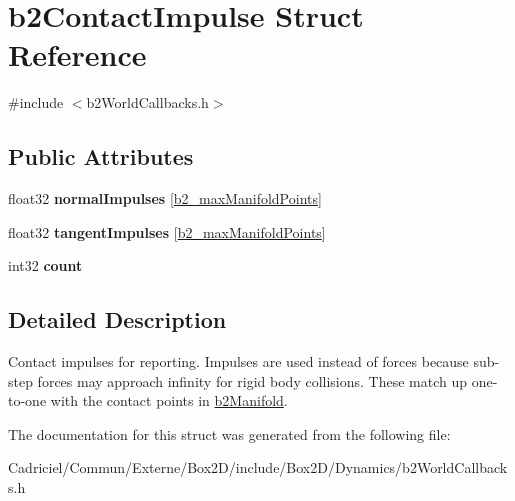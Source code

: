 \hypertarget{structb2_contact_impulse}{}\section{b2\+Contact\+Impulse Struct Reference}
\label{structb2_contact_impulse}


{\ttfamily \#include $<$b2\+World\+Callbacks.\+h$>$}

\subsection*{Public Attributes}
\begin{DoxyCompactItemize}
\item 
float32 {\bfseries normal\+Impulses} \mbox{[}\hyperlink{b2_settings_8h_aa5f44cc9edf711433dea2b2ec94f3c42}{b2\+\_\+max\+Manifold\+Points}\mbox{]}\hypertarget{structb2_contact_impulse_a553d3562a3a34ea013e2d9860f6fd207}{}\label{structb2_contact_impulse_a553d3562a3a34ea013e2d9860f6fd207}

\item 
float32 {\bfseries tangent\+Impulses} \mbox{[}\hyperlink{b2_settings_8h_aa5f44cc9edf711433dea2b2ec94f3c42}{b2\+\_\+max\+Manifold\+Points}\mbox{]}\hypertarget{structb2_contact_impulse_aebd9875b1f55a90865770a53e30e609a}{}\label{structb2_contact_impulse_aebd9875b1f55a90865770a53e30e609a}

\item 
int32 {\bfseries count}\hypertarget{structb2_contact_impulse_a258e094ab0d769971f40d6c144420bf7}{}\label{structb2_contact_impulse_a258e094ab0d769971f40d6c144420bf7}

\end{DoxyCompactItemize}


\subsection{Detailed Description}
Contact impulses for reporting. Impulses are used instead of forces because sub-\/step forces may approach infinity for rigid body collisions. These match up one-\/to-\/one with the contact points in \hyperlink{structb2_manifold}{b2\+Manifold}. 

The documentation for this struct was generated from the following file\+:\begin{DoxyCompactItemize}
\item 
Cadriciel/\+Commun/\+Externe/\+Box2\+D/include/\+Box2\+D/\+Dynamics/b2\+World\+Callbacks.\+h\end{DoxyCompactItemize}
